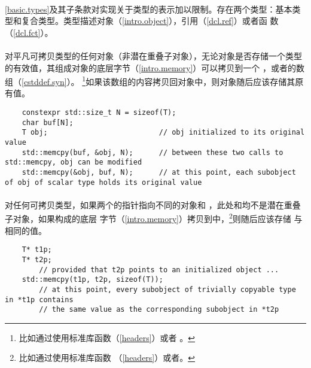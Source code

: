 \paragraph{} %
\begin{note}
  \ref{basic.types}及其子条款对实现关于类型的表示加以限制。存在两个类型：基本类
  型和复合类型。类型描述对象（\ref{intro.object}），引用（\ref{dcl.ref}）或者函
  数（\ref{dcl.fct}）。
\end{note}

\paragraph{} %
对平凡可拷贝类型的任何对象（非潜在重叠子对象），无论对象是否存储一个类型
的有效值，其组成对象的底层字节（\ref{intro.memory}）可以拷贝到一个
，或者的数组（\ref{cstddef.syn}）。
\footnote{比如通过使用标准库函数（\ref{headers}）或者
。}如果该数组的内容拷贝回对象中，则对象随后应该存储其原有值。

\begin{example}
  \begin{lstlisting}
    constexpr std::size_t N = sizeof(T);
    char buf[N];
    T obj;                          // obj initialized to its original value
    std::memcpy(buf, &obj, N);      // between these two calls to std::memcpy, obj can be modified
    std::memcpy(&obj, buf, N);      // at this point, each subobject of obj of scalar type holds its original value
  \end{lstlisting}
\end{example}

\paragraph{} %
对任何可拷贝类型，如果两个的指针指向不同的对象和
，此处和均不是潜在重叠子对象，如果构成的底层
字节（\ref{intro.memory}）拷贝到中，\footnote{比如通过使用标准库函数
（\ref{headers}）或者。}则随后应该存储
与相同的值。

\begin{example}
  \begin{lstlisting}
    T* t1p;
    T* t2p;
        // provided that t2p points to an initialized object ...
    std::memcpy(t1p, t2p, sizeof(T));
        // at this point, every subobject of trivially copyable type in *t1p contains
        // the same value as the corresponding subobject in *t2p
  \end{lstlisting}
\end{example}

